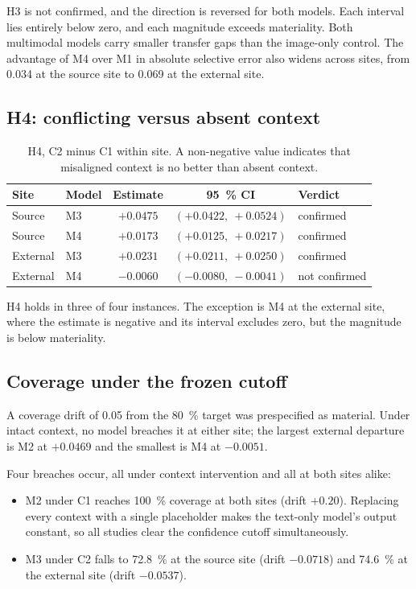 H3 is not confirmed, and the direction is reversed for both models. Each
interval lies entirely below zero, and each magnitude exceeds materiality.
Both multimodal models carry smaller transfer gaps than the image-only control.
The advantage of M4 over M1 in absolute selective error also widens across
sites, from \num{0.034} at the source site to \num{0.069} at the external site.

\subsection{H4: conflicting versus absent context}

\begin{table}[htbp]
\centering
\caption{H4, C2 minus C1 within site. A non-negative value indicates that
misaligned context is no better than absent context.}
\label{tab:h4}
\begin{tabular}{llccl}
\toprule
Site & Model & Estimate & \SI{95}{\percent} CI & Verdict \\
\midrule
Source   & M3 & $+0.0475$ & $(+0.0422,\ +0.0524)$ & confirmed \\
Source   & M4 & $+0.0173$ & $(+0.0125,\ +0.0217)$ & confirmed \\
External & M3 & $+0.0231$ & $(+0.0211,\ +0.0250)$ & confirmed \\
External & M4 & $-0.0060$ & $(-0.0080,\ -0.0041)$ & not confirmed \\
\bottomrule
\end{tabular}
\end{table}

H4 holds in three of four instances. The exception is M4 at the external site,
where the estimate is negative and its interval excludes zero, but the
magnitude is below materiality.

\subsection{Coverage under the frozen cutoff}

A coverage drift of \num{0.05} from the \SI{80}{\percent} target was
prespecified as material. Under intact context, no model breaches it at either
site; the largest external departure is M2 at $+0.0469$ and the smallest is M4
at $-0.0051$.

Four breaches occur, all under context intervention and all at both sites
alike:

\begin{itemize}
  \item M2 under C1 reaches \SI{100}{\percent} coverage at both sites
    (drift $+0.20$). Replacing every context with a single placeholder makes the
    text-only model's output constant, so all studies clear the confidence
    cutoff simultaneously.
  \item M3 under C2 falls to \SI{72.8}{\percent} at the source site
    (drift $-0.0718$) and \SI{74.6}{\percent} at the external site
    (drift $-0.0537$).
\end{itemize}

